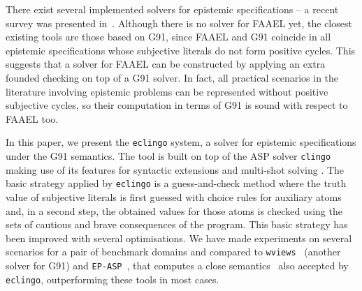 \documentclass{new_tlp}
\def\eclingo{{\tt eclingo}}
\def\wviews{{\tt wviews}}
\def\EPASP{{\tt EP-ASP}}
\begin{document}
There exist several implemented solvers for epistemic specifications -- a recent survey was presented in~\cite{leckah18}.
%
Although there is no solver for FAAEL yet, the closest existing tools are those based on G91, since FAAEL and G91 coincide in all epistemic specifications whose subjective literals do not form positive cycles.
%
This suggests that a solver for FAAEL can be constructed by applying an extra founded checking on top of a G91 solver.
%
In fact, all practical scenarios in the literature involving epistemic problems can be represented without positive subjective cycles, so their computation in terms of G91 is sound with respect to FAAEL too.

In this paper, we present the \eclingo{} system, a solver for epistemic specifications under the G91 semantics.
%
The tool is built on top of the ASP solver {\tt clingo}~\cite{gekakaosscwa16a}
making use of its features for syntactic extensions and multi-shot solving \cite{gekakasc17a}.
%
The basic strategy applied by \eclingo{} is a guess-and-check method where the truth value of subjective literals is first guessed with choice rules for auxiliary atoms and, in a second step, the obtained values for those atoms is checked using the sets of cautious and brave consequences of the program.
%
This basic strategy has been improved with several optimisations.
%
We have made experiments on several scenarios for a pair of benchmark domains and compared to \wviews~\cite{Kelly07} (another solver for G91) and {\tt \EPASP}~\cite{SLKL17}, that computes a close semantics~\cite{kawabagezh15} also accepted by \eclingo{}, outperforming these tools in most cases.




\end{document}
